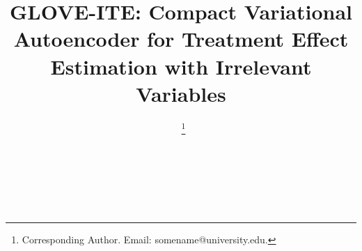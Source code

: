 \documentclass[doubleblind]{ecai}
\begin{document}
	\newcommand{\samenote}{\footnotemark[1]} 
	
	
	\begin{frontmatter}
		
		
		
		
		\title{GLOVE-ITE: Compact Variational Autoencoder for Treatment Effect Estimation with Irrelevant Variables
		}
		
		
		\author[A]{~\thanks{Corresponding Author. Email: somename@university.edu.}}
		
		\author[A]{~}
		
		\author[A]{~} 
		
		\address[A]{U}
		
		
		
		

\end{frontmatter}
\end{document}
